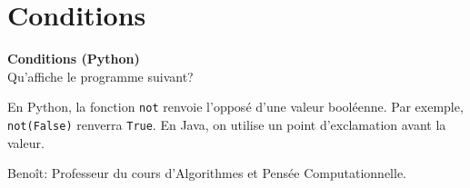 \newpage

\section{Conditions}

\begin{Exercice}[5 minutes] \textbf{Conditions (Python)}\\
    Qu'affiche le programme suivant? \\
    
    

     \begin{conseil}
         En Python, la fonction \lstinline{not} renvoie l'opposé d'une valeur booléenne. Par exemple, \lstinline{not(False)} renverra \lstinline{True}. En Java, on utilise un point d'exclamation avant la valeur.
     \end{conseil}
     \begin{solution}
        Benoît: Professeur du cours d'Algorithmes et Pensée Computationnelle.
     \end{solution}   
 \end{Exercice}


